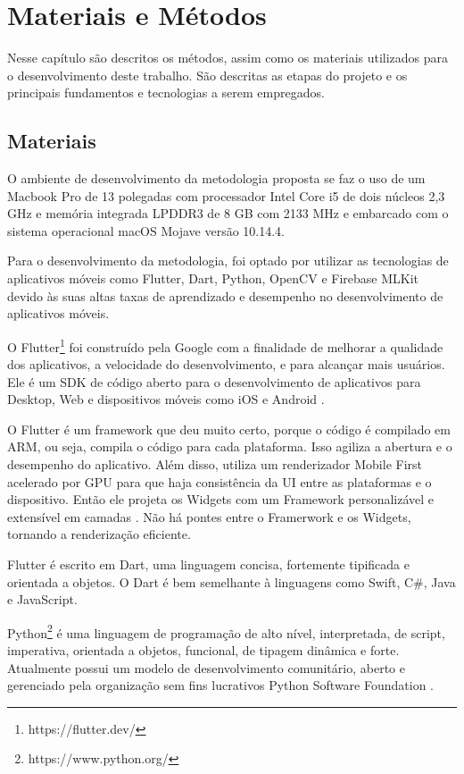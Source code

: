 \chapter{Materiais e Métodos} \label{cap:metod}

Nesse capítulo são descritos os métodos, assim como os materiais utilizados para o desenvolvimento deste trabalho. São descritas as etapas do projeto e os principais fundamentos e tecnologias a serem empregados.


\section{Materiais}
O ambiente de desenvolvimento da metodologia proposta se faz o uso de um Macbook Pro de 13 polegadas com processador Intel Core i5 de dois núcleos 2,3 GHz e memória integrada LPDDR3 de 8 GB com 2133 MHz e embarcado com o sistema operacional macOS Mojave versão 10.14.4.  

Para o desenvolvimento da metodologia, foi optado por utilizar as tecnologias de aplicativos móveis como Flutter, Dart, Python, OpenCV e Firebase MLKit devido às suas altas taxas de aprendizado e desempenho no desenvolvimento de aplicativos móveis.

O Flutter\footnote{https://flutter.dev/} foi construído pela Google com a finalidade de melhorar a qualidade dos aplicativos, a velocidade do desenvolvimento, e para alcançar mais usuários. Ele é um SDK  de código aberto para o desenvolvimento de aplicativos para Desktop, Web e dispositivos móveis como iOS e Android \cite{ARSTECHNICA2017}.


O Flutter é um framework que deu muito certo, porque o código é compilado em ARM, ou seja, compila o código para cada plataforma. Isso agiliza a abertura e o desempenho do aplicativo. Além disso, utiliza um renderizador Mobile First acelerado por GPU para que haja consistência da UI entre as plataformas e o dispositivo. Então ele projeta os Widgets com um Framework personalizável e extensível em camadas \cite{IMASTERS}. Não há pontes entre o Framerwork e os Widgets, tornando a renderização eficiente. 

Flutter é escrito em Dart, uma linguagem concisa, fortemente tipificada e orientada a objetos. O Dart é bem semelhante à linguagens como Swift, C#, Java e JavaScript.

Python\footnote{https://www.python.org/} é uma linguagem de programação de alto nível, interpretada, de script, imperativa, orientada a objetos, funcional, de tipagem dinâmica e forte. Atualmente possui um modelo de desenvolvimento comunitário, aberto e gerenciado pela organização sem fins lucrativos Python Software Foundation \cite{PYTHON}.

